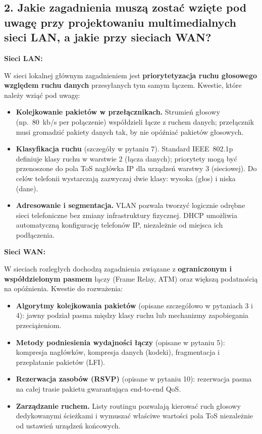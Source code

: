\documentclass[12pt,a4paper]{article}
\begin{document}
\subsection*{2. Jakie zagadnienia muszą zostać wzięte pod uwagę przy projektowaniu
multimedialnych sieci LAN, a jakie przy sieciach WAN?}

\textbf{Sieci LAN:}

W sieci lokalnej głównym zagadnieniem jest \textbf{priorytetyzacja ruchu
głosowego względem ruchu danych} przesyłanych tym samym łączem. Kwestie,
które należy wziąć pod uwagę:

\begin{itemize}
  \item \textbf{Kolejkowanie pakietów w przełącznikach.} Strumień głosowy
        (np.\ 80~kb/s per połączenie) współdzieli łącze z ruchem danych;
        przełącznik musi gromadzić pakiety danych tak, by nie opóźniać pakietów
        głosowych.
  \item \textbf{Klasyfikacja ruchu} (szczegóły w pytaniu 7). Standard
        IEEE~802.1p definiuje klasy ruchu w warstwie 2 (łącza danych);
        priorytety mogą być przenoszone do pola ToS nagłówka IP dla urządzeń
        warstwy 3 (sieciowej). Do celów telefonii wystarczają zazwyczaj dwie
        klasy: wysoka (głos) i niska (dane).
  \item \textbf{Adresowanie i segmentacja.} VLAN pozwala tworzyć logicznie
        odrębne sieci telefoniczne bez zmiany infrastruktury fizycznej.
        DHCP umożliwia automatyczną konfigurację telefonów IP, niezależnie
        od miejsca ich podłączenia.
\end{itemize}

\textbf{Sieci WAN:}

W sieciach rozległych dochodzą zagadnienia związane z \textbf{ograniczonym
i współdzielonym pasmem} łączy (Frame Relay, ATM) oraz większą podatnością
na opóźnienia. Kwestie do rozważenia:

\begin{itemize}
  \item \textbf{Algorytmy kolejkowania pakietów} (opisane szczegółowo
        w pytaniach 3 i 4): jawny podział pasma między klasy ruchu lub
        mechanizmy zapobiegania przeciążeniom.
  \item \textbf{Metody podniesienia wydajności łączy} (opisane w pytaniu 5):
        kompresja nagłówków, kompresja danych (kodeki), fragmentacja
        i przeplatanie pakietów (LFI).
  \item \textbf{Rezerwacja zasobów (RSVP)} (opisane w pytaniu 10): rezerwacja
        pasma na całej trasie pakietu gwarantująca end-to-end QoS.
  \item \textbf{Zarządzanie ruchem.} Listy routingu pozwalają kierować ruch
        głosowy dedykowanymi ścieżkami i wymuszać właściwe wartości pola ToS
        niezależnie od ustawień urządzeń końcowych.
\end{itemize}
\end{document}

